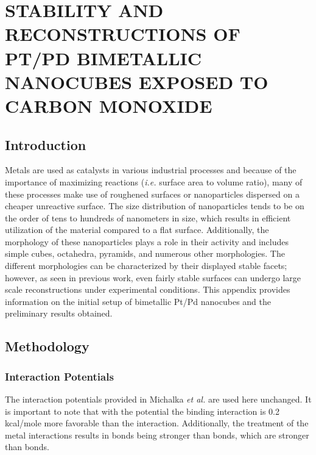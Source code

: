\chapter{STABILITY AND RECONSTRUCTIONS OF PT/PD BIMETALLIC NANOCUBES EXPOSED TO CARBON MONOXIDE}
\label{app:cube}

\section{Introduction}

Metals are used as catalysts in various industrial processes and because of the
importance of maximizing reactions ({\em i.e.} surface area to volume ratio),
many of these processes make use of roughened surfaces or nanoparticles
dispersed on a cheaper unreactive surface.\citep{Munnik:2015qf, Graham:2007ng}
The size distribution of nanoparticles tends to be on the order of tens to
hundreds of nanometers in size, which results in efficient utilization of the
material compared to a flat surface.\citep{Zhang:2011ne, Liu:2013hf}
Additionally, the morphology of these nanoparticles plays a role in their
activity and includes simple cubes, octahedra, pyramids, and numerous other
morphologies.\citep{Ahmadi:2015os, Wang:2015qb, Wang:2016dg} The different
morphologies can be characterized by their displayed stable facets;
however, as seen in previous work\citep{Tao:2010aa, Michalka:2013aa,
Michalka:2015aa, Kim:2016cr}, even fairly stable surfaces can undergo large
scale reconstructions under experimental conditions. This appendix provides
information on the initial setup of bimetallic Pt/Pd nanocubes and the
preliminary results obtained. 

\section{Methodology}
\subsection{Interaction Potentials}
The interaction potentials provided in Michalka {\em et
al.}\citep{Michalka:2015aa} are used here unchanged. It is important to note
that with the potential the  binding interaction is 0.2
kcal/mole more favorable than the  interaction. Additionally,
the treatment of the metal interactions results in  bonds
being stronger than  bonds, which are stronger than
 bonds.

